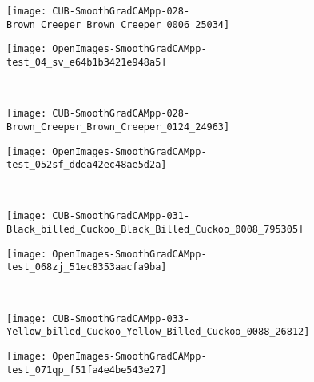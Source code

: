 \documentclass[twocolumn]{article}
\theoremstyle{definition}
\begin{document}
\begin{figure*}
     \vspace{0.1cm}
     \begin{subfigure}[b]{0.49\textwidth}
         \centering
         \texttt{[image: CUB-SmoothGradCAMpp-028-Brown\_Creeper\_Brown\_Creeper\_0006\_25034]}
     \end{subfigure}
     \hfill
     \begin{subfigure}[b]{0.49\textwidth}
         \centering
         \texttt{[image: OpenImages-SmoothGradCAMpp-test\_04\_sv\_e64b1b3421e948a5]}
     \end{subfigure}
     \\
     \vspace{0.1cm}
     \begin{subfigure}[b]{0.49\textwidth}
         \centering
         \texttt{[image: CUB-SmoothGradCAMpp-028-Brown\_Creeper\_Brown\_Creeper\_0124\_24963]}
     \end{subfigure}
     \hfill
     \begin{subfigure}[b]{0.49\textwidth}
         \centering
         \texttt{[image: OpenImages-SmoothGradCAMpp-test\_052sf\_ddea42ec48ae5d2a]}
     \end{subfigure}
      \\
     \vspace{0.1cm}
     \begin{subfigure}[b]{0.49\textwidth}
         \centering
         \texttt{[image: CUB-SmoothGradCAMpp-031-Black\_billed\_Cuckoo\_Black\_Billed\_Cuckoo\_0008\_795305]}
     \end{subfigure}
     \hfill
     \begin{subfigure}[b]{0.49\textwidth}
         \centering
         \texttt{[image: OpenImages-SmoothGradCAMpp-test\_068zj\_51ec8353aacfa9ba]}
     \end{subfigure}
      \\
     \vspace{0.1cm}
     \begin{subfigure}[b]{0.49\textwidth}
         \centering
         \texttt{[image: CUB-SmoothGradCAMpp-033-Yellow\_billed\_Cuckoo\_Yellow\_Billed\_Cuckoo\_0088\_26812]}
     \end{subfigure}
     \hfill
     \begin{subfigure}[b]{0.49\textwidth}
         \centering
         \texttt{[image: OpenImages-SmoothGradCAMpp-test\_071qp\_f51fa4e4be543e27]}
     \end{subfigure}
      \\
     \vspace{0.1cm}

\end{figure*}
\end{document}
